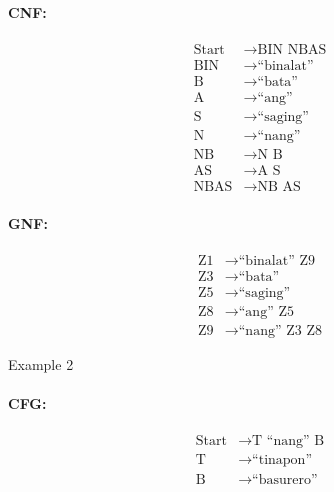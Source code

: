 \paragraph{CNF:}
\begin{equation*}
    \begin{aligned}
        \text{Start}   & \rightarrow \text{BIN NBAS}   \\
        \text{BIN} & \rightarrow \text{“binalat”} \\
        \text{B} & \rightarrow \text{“bata”} \\
        \text{A} & \rightarrow \text{“ang”} \\
        \text{S} & \rightarrow \text{“saging”} \\
        \text{N} & \rightarrow \text{“nang”} \\
        \text{NB} & \rightarrow \text{N B} \\
        \text{AS} & \rightarrow \text{A S} \\
        \text{NBAS} & \rightarrow \text{NB AS}
    \end{aligned}
\end{equation*}

\paragraph{GNF:}
\begin{equation*}
    \begin{aligned}
        \text{Z1}   & \rightarrow \text{“binalat” Z9}   \\
        \text{Z3} & \rightarrow \text{“bata”} \\
        \text{Z5} & \rightarrow \text{“saging”} \\
        \text{Z8} & \rightarrow \text{“ang” Z5} \\
        \text{Z9} & \rightarrow \text{“nang” Z3 Z8}
    \end{aligned}
\end{equation*}

Example 2
\paragraph{CFG:}
\begin{equation*}
    \begin{aligned}
        \text{Start}   & \rightarrow \text{T “nang” B}   \\
        \text{T} & \rightarrow \text{“tinapon”} \\
        \text{B} & \rightarrow \text{“basurero”}
    \end{aligned}
\end{equation*}

